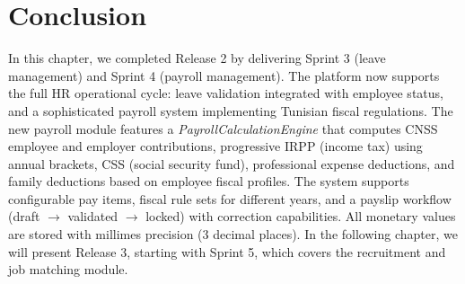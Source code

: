 \section*{Conclusion}
In this chapter, we completed Release 2 by delivering Sprint 3 (leave management) and Sprint 4 (payroll management). The platform now supports the full HR operational cycle: leave validation integrated with employee status, and a sophisticated payroll system implementing Tunisian fiscal regulations. The new payroll module features a \textit{PayrollCalculationEngine} that computes CNSS employee and employer contributions, progressive IRPP (income tax) using annual brackets, CSS (social security fund), professional expense deductions, and family deductions based on employee fiscal profiles. The system supports configurable pay items, fiscal rule sets for different years, and a payslip workflow (draft $\rightarrow$ validated $\rightarrow$ locked) with correction capabilities. All monetary values are stored with millimes precision (3 decimal places). In the following chapter, we will present Release 3, starting with Sprint 5, which covers the recruitment and job matching module.
